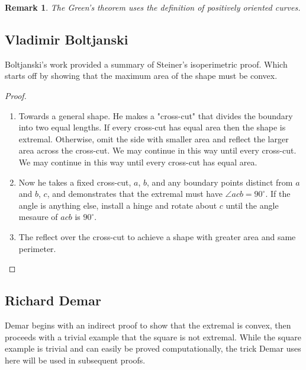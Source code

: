 \documentclass[a4paper]{book}
\newtheorem{remark}[theorem]{Remark}%
\numberwithin{theorem}{section}%
\begin{document}
\begin{remark}
    The Green's theorem uses the definition of positively oriented curves.
\end{remark}

\subsection{Vladimir Boltjanski}
Boltjanski's work provided a summary of Steiner's isoperimetric proof. Which starts off by showing that the maximum area of the shape must be convex.
\begin{proof}
	\begin{enumerate}
		\item Towards a general shape. He makes a "cross-cut" that divides the boundary into two equal lengths. If every cross-cut has equal area then the shape is extremal. Otherwise, omit the side with smaller area and reflect the larger area across the cross-cut. We may continue in this way until every cross-cut. We may continue in this way until every cross-cut has equal area.
		\item Now  he takes a fixed cross-cut, $a$, $b$, and any boundary points distinct from $a$ and $b$, $c$, and demonstrates that the extremal must have $\angle acb=90^{\circ}$. If the angle is anything else, install a hinge and rotate about $c$ until the angle mesaure of $acb$ is $90^{\circ}$.
		\item The reflect over the cross-cut to achieve a shape with greater area and same perimeter.
	\end{enumerate}
\end{proof}

\subsection{Richard Demar}
Demar begins with an indirect proof to show that the extremal is convex, then proceeds with a trivial example that the square is not extremal. While the square example is trivial and can easily be proved computationally, the trick Demar uses here will be used in subsequent proofs.
\end{document}
